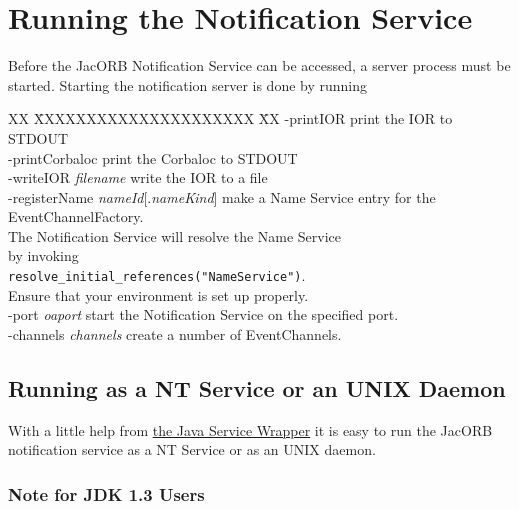 \section{Running the Notification Service}
\label{sec:ntfy-running}

Before the JacORB Notification Service can be accessed, a server
process must be started. Starting
the notification server is done by running


\begin{tabbing}
XX \= XXXXXXXXXXXXXXXXXXXXX \= XX \kill
\> -printIOR \> print the IOR to STDOUT \\
\> -printCorbaloc \> print the Corbaloc to STDOUT \\
\> -writeIOR \emph{filename} \> write the IOR to a file \\
\> -registerName \emph{nameId}[.\emph{nameKind}] \> make a Name Service entry
for the EventChannelFactory. \\
\> \> The Notification Service will resolve the Name Service \\
\> \> by invoking \\
\> \> \texttt{resolve\_initial\_references("NameService")}. \\
\> \> Ensure that your environment is set up properly. \\
\> -port \emph{oaport} \> start the Notification Service on the specified
port. \\
\> -channels \emph{channels} \> create a number of EventChannels. \\
\end{tabbing}

\subsection{Running as a NT Service or an UNIX Daemon}
\label{sec:runn-notif-serv-1}

With a little help from
\href{http://wrapper.tanukisoftware.org}{the Java Service Wrapper} it is
easy to run the JacORB notification service as a NT Service or as
an UNIX daemon. 


\subsubsection{Note for JDK 1.3 Users}
\label{sec:ntfy-jdk1.3}


